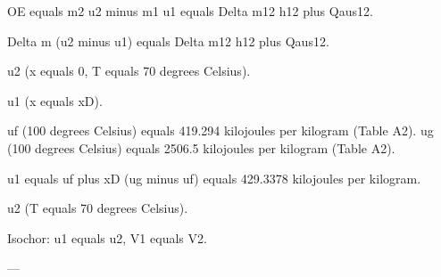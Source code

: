 OE equals m2 u2 minus m1 u1 equals Delta m12 h12 plus Qaus12.  

Delta m (u2 minus u1) equals Delta m12 h12 plus Qaus12.  

u2 (x equals 0, T equals 70 degrees Celsius).  

u1 (x equals xD).  

uf (100 degrees Celsius) equals 419.294 kilojoules per kilogram (Table A2).  
ug (100 degrees Celsius) equals 2506.5 kilojoules per kilogram (Table A2).  

u1 equals uf plus xD (ug minus uf) equals 429.3378 kilojoules per kilogram.  

u2 (T equals 70 degrees Celsius).  

Isochor: u1 equals u2, V1 equals V2.  

---
